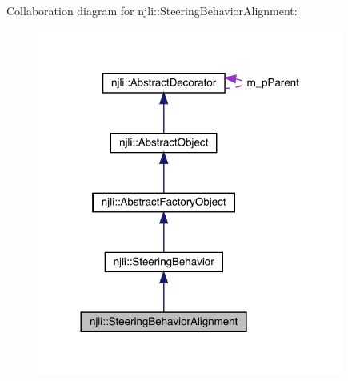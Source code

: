 Collaboration diagram for njli\+:\+:Steering\+Behavior\+Alignment\+:\nopagebreak
\begin{figure}[H]
\begin{center}
\leavevmode
\includegraphics[width=284pt]{classnjli_1_1_steering_behavior_alignment__coll__graph}
\end{center}
\end{figure}
